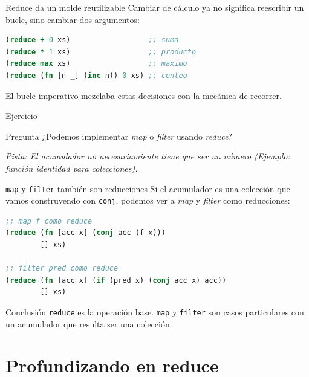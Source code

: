 \documentclass{beamer}
\begin{document}
\begin{frame}[fragile]{Reduce da un molde reutilizable}
    Cambiar de cálculo ya no significa reescribir un bucle, sino cambiar dos argumentos:

    \begin{lstlisting}[language=Clojure]
(reduce + 0 xs)                  ;; suma
(reduce * 1 xs)                  ;; producto
(reduce max xs)                  ;; maximo
(reduce (fn [n _] (inc n)) 0 xs) ;; conteo
    \end{lstlisting}

    \vspace{0.2cm}
    El bucle imperativo mezclaba estas decisiones con la mecánica de recorrer. 
\end{frame}

\begin{frame}[fragile]{Ejercicio}

    \begin{block}{Pregunta}
        ¿Podemos implementar \textit{map} o \textit{filter} usando \textit{reduce}?
    \end{block}
    

    \textit{Pista: El acumulador no necesariamiente tiene que ser un número (Ejemplo: función identidad para colecciones).}
\end{frame}

\begin{frame}[fragile]{\texttt{map} y \texttt{filter} también son reducciones}
    Si el acumulador es una colección que vamos construyendo con \texttt{conj}, podemos ver a \textit{map} y \textit{filter} como reducciones:

    \begin{lstlisting}[language=Clojure]
;; map f como reduce
(reduce (fn [acc x] (conj acc (f x)))
        [] xs)

;; filter pred como reduce
(reduce (fn [acc x] (if (pred x) (conj acc x) acc))
        [] xs)
    \end{lstlisting}

    \begin{alertblock}{Conclusión}
        \texttt{reduce} es la operación base. \texttt{map} y \texttt{filter} son casos particulares con un acumulador que resulta ser una colección.
    \end{alertblock}
\end{frame}

\section{Profundizando en reduce}
\end{document}

